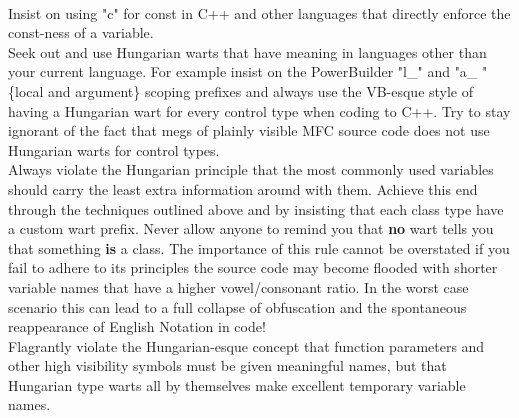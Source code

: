 \documentclass[11pt,twoside,a4paper]{article}
\begin{document}
\begin{minipage}[ht]{0.15\textwidth} ~\\ \end{minipage} \hfill \begin{minipage}[ht]{0.85\textwidth}
	Insist on using "c" for const in C++ and other languages that directly enforce the const-ness of a variable.~\\ 
	
	Seek out and use Hungarian warts that have meaning in languages other than your current language. For example insist on the PowerBuilder "l\_" and "a\_ " \{local and argument\} scoping prefixes and always use the VB-esque style of having a Hungarian wart for every control type when coding to C++. Try to stay ignorant of the fact that megs of plainly visible MFC source code does not use Hungarian warts for control types.~\\ 

	Always violate the Hungarian principle that the most commonly used variables should carry the least extra information around with them. Achieve this end through the techniques outlined above and by insisting that each class type have a custom wart prefix. Never allow anyone to remind you that \textbf{no} wart tells you that something \textbf{is} a class. The importance of this rule cannot be overstated if you fail to adhere to its principles the source code may become flooded with shorter variable names that have a higher vowel/consonant ratio. In the worst case scenario this can lead to a full collapse of obfuscation and the spontaneous reappearance of English Notation in code!~\\ 

	Flagrantly violate the Hungarian-esque concept that function parameters and other high visibility symbols must be given meaningful names, but that Hungarian type warts all by themselves make excellent temporary variable names.~\\ 
\end{minipage}~\\
\end{document}
